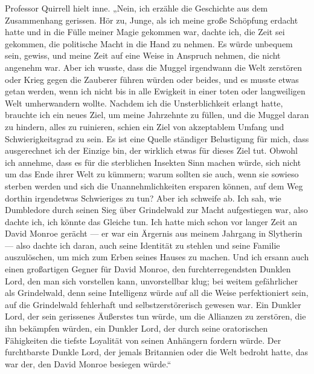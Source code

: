 Professor Quirrell hielt inne.
„Nein, ich erzähle die Geschichte aus dem Zusammenhang gerissen. Hör zu, Junge, als ich meine große Schöpfung erdacht hatte und in die Fülle meiner Magie gekommen war, dachte ich, die Zeit sei gekommen, die politische Macht in die Hand zu nehmen. Es würde unbequem sein, gewiss, und meine Zeit auf eine Weise in Anspruch nehmen, die nicht angenehm war. Aber ich wusste, dass die Muggel irgendwann die Welt zerstören oder Krieg gegen die Zauberer führen würden oder beides, und es musste etwas getan werden, wenn ich nicht bis in alle Ewigkeit in einer toten oder langweiligen Welt umherwandern wollte. Nachdem ich die Unsterblichkeit erlangt hatte, brauchte ich ein neues Ziel, um meine Jahrzehnte zu füllen, und die Muggel daran zu hindern, alles zu ruinieren, schien ein Ziel von akzeptablem Umfang und Schwierigkeitsgrad zu sein. Es ist eine Quelle ständiger Belustigung für mich, dass ausgerechnet ich der Einzige bin, der wirklich etwas für dieses Ziel tut. Obwohl ich annehme, dass es für die sterblichen Insekten Sinn machen würde, sich nicht um das Ende ihrer Welt zu kümmern; warum sollten sie auch, wenn sie sowieso sterben werden und sich die Unannehmlichkeiten ersparen können, auf dem Weg dorthin irgendetwas Schwieriges zu tun? Aber ich schweife ab. Ich sah, wie Dumbledore durch seinen Sieg über Grindelwald zur Macht aufgestiegen war, also dachte ich, ich könnte das Gleiche tun. Ich hatte mich schon vor langer Zeit an David Monroe gerächt — er war ein Ärgernis aus meinem Jahrgang in Slytherin — also dachte ich daran, auch seine Identität zu stehlen und seine Familie auszulöschen, um mich zum Erben seines Hauses zu machen. Und ich ersann auch einen großartigen Gegner für David Monroe, den furchterregendsten Dunklen Lord, den man sich vorstellen kann, unvorstellbar klug; bei weitem gefährlicher als Grindelwald, denn seine Intelligenz würde auf all die Weise perfektioniert sein, auf die Grindelwald fehlerhaft und selbstzerstörerisch gewesen war. Ein Dunkler Lord, der sein gerissenes Äußerstes tun würde, um die Allianzen zu zerstören, die ihn bekämpfen würden, ein Dunkler Lord, der durch seine oratorischen Fähigkeiten die tiefste Loyalität von seinen Anhängern fordern würde. Der furchtbarste Dunkle Lord, der jemals Britannien oder die Welt bedroht hatte, das war der, den David Monroe besiegen würde.“

